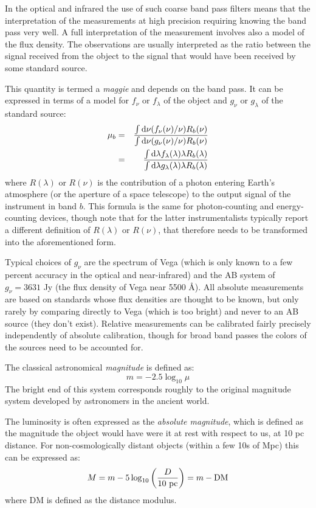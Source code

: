 In the optical and infrared the use of such coarse band pass filters
means that the interpretation of the measurements at high precision
requiring knowing the band pass very well. A full interpretation of
the measurement involves also a model of the flux density. The
observations are usually interpreted as the ratio between the signal
received from the object to the signal that would have been received
by some standard source.

This quantity is termed a {\it maggie} and depends on the band
pass. It can be expressed in terms of a model for $f_\nu$ or
$f_\lambda$ of the object and $g_\nu$ or $g_\lambda$ of the standard
source:
\begin{eqnarray}
  \mu_b &=&
  \frac{\int {\rm d}\nu (f_\nu(\nu)/\nu) R_b(\nu)}
       {\int {\rm d}\nu (g_\nu(\nu)/\nu) R_b(\nu)} \cr
       &=&
  \frac{\int {\rm d}\lambda f_\lambda(\lambda) \lambda R_b(\lambda) }
       {\int {\rm d}\lambda g_\lambda(\lambda) \lambda R_b(\lambda)} 
\end{eqnarray}
where $R(\lambda)$ or $R(\nu)$ is the contribution of a photon
entering Earth's atmosphere (or the aperture of a space telescope) to
the output signal of the instrument in band $b$. This formula is the
same for photon-counting and energy-counting devices, though note that
for the latter instrumentalists typically report a different
definition of $R(\lambda)$ or $R(\nu)$, that therefore needs to be
transformed into the aforementioned form.

Typical choices of $g_\nu$ are the spectrum of Vega (which is only
known to a few percent accuracy in the optical and near-infrared) and
the AB system of $g_\nu = 3631$ Jy (the flux density of Vega near 5500
\AA).  All absolute measurements are based on standards whose flux
densities are thought to be known, but only rarely by comparing
directly to Vega (which is too bright) and never to an AB source (they
don't exist). Relative measurements can be calibrated fairly precisely
independently of absolute calibration, though for broad band passes
the colors of the sources need to be accounted for.

The classical astronomical {\it magnitude} is defined as:
\begin{equation}
m = -2.5 \log_{10} \mu
\end{equation}
The bright end of this system corresponds roughly to the original
magnitude system developed by astronomers in the ancient world.

The luminosity is often expressed as the {\it absolute magnitude},
which is defined as the magnitude the object would have were it at
rest with respect to us, at 10 pc distance. For non-cosmologically
distant objects (within a few 10s of Mpc) this can be expressed as:
\begin{equation}
M = m - 5 \log_{10} \left(\frac{D}{10 {\rm ~pc}}\right) = m - {\rm DM}
\end{equation}
where DM is defined as the distance modulus. 

